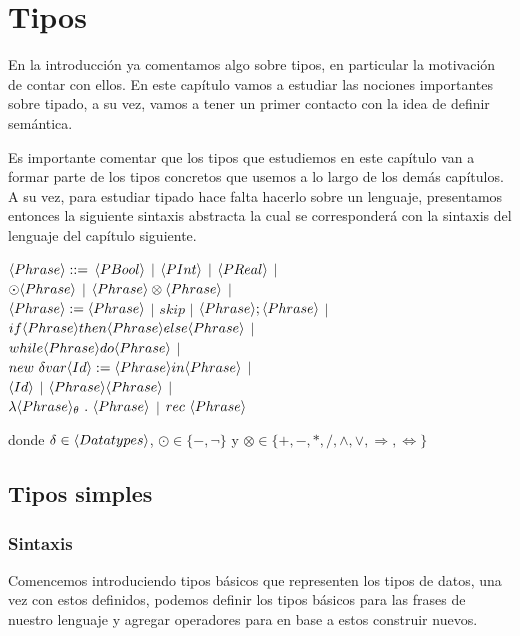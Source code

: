 \chapter{Tipos}
\label{chap:types}

En la introducci\'on ya comentamos algo sobre tipos, en particular la 
motivaci\'on de contar con ellos. En este cap\'itulo vamos a estudiar las 
nociones importantes sobre tipado, a su vez, vamos a tener un primer contacto
con la idea de definir sem\'antica. \

Es importante comentar que los tipos que estudiemos en este cap\'itulo van
a formar parte de los tipos concretos que usemos a lo largo de los dem\'as
cap\'itulos. A su vez, para estudiar tipado hace falta hacerlo sobre un
lenguaje, presentamos entonces la siguiente sintaxis abstracta la cual
se corresponder\'a con la sintaxis del lenguaje del cap\'itulo siguiente.

\begin{center} 

$\langle Phrase \rangle ::=$ $\langle PBool \rangle$ $|$ $\langle PInt \rangle$ $|$ $\langle PReal \rangle$ $|$ \\
$\odot \langle Phrase \rangle$ $|$ $\langle Phrase \rangle \otimes \langle Phrase \rangle $ $|$ \\
$\langle Phrase \rangle := \langle Phrase \rangle$ $|$ $skip$ $|$ $\langle Phrase \rangle;\langle Phrase \rangle$ $|$ \\
$if \langle Phrase \rangle then \langle Phrase \rangle else \langle Phrase \rangle$ $|$\\
$while \langle Phrase \rangle do \langle Phrase \rangle$ $|$ \\
$new \ \delta var \langle Id \rangle := \langle Phrase \rangle in \langle Phrase \rangle$ $|$\\
$\langle Id \rangle$ $|$ $\langle Phrase \rangle\langle Phrase \rangle$ $|$\\
$\lambda \lrangles{Phrase}_\theta \ . \ \lrangles{Phrase} $ $|$ $rec \ \langle Phrase \rangle$

\end{center}

donde $\delta \in \langle Data types \rangle$, $\odot \in \{-, \neg\}$ y 
$\otimes \in \{+,-,*,/,\wedge,\vee,\Rightarrow,\Leftrightarrow\}$

\section{Tipos simples}

\subsection{Sintaxis}
Comencemos introduciendo tipos b\'asicos que representen los tipos de datos,
una vez con estos definidos, podemos definir los tipos b\'asicos para las
frases de nuestro lenguaje y agregar operadores para en base a estos
construir nuevos.\

